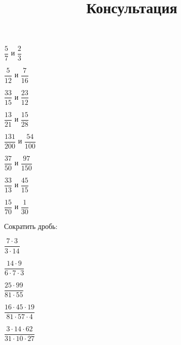 \begin{listofex}
	\begin{enumcols}[itemcolumns=4]
		\item \( \dfrac{5}{7} \) и \( \dfrac{2}{3} \)
		\item \( \dfrac{5}{12} \) и \( \dfrac{7}{16} \)
		\item \( \dfrac{33}{15} \) и \( \dfrac{23}{12} \)
		\item \( \dfrac{13}{21} \) и \( \dfrac{15}{28} \)
		\item \( \dfrac{131}{200} \) и \( \dfrac{54}{100} \)
		\item \( \dfrac{37}{50} \) и \( \dfrac{97}{150} \)
		\item \( \dfrac{33}{13} \) и \( \dfrac{45}{15} \)
		\item \( \dfrac{15}{70} \) и \( \dfrac{1}{30} \)
	\end{enumcols}
	\item Сократить дробь:
	\begin{enumcols}[itemcolumns=5]
		\item \( \dfrac{7\cdot3}{3\cdot14} \)
		\item \( \dfrac{14\cdot9}{6\cdot7\cdot3} \)
		\item \( \dfrac{25\cdot99}{81\cdot55} \)
		\item \( \dfrac{16\cdot45\cdot19}{81\cdot57\cdot4} \)
		\item \( \dfrac{3\cdot14\cdot62}{31\cdot10\cdot27} \)
	\end{enumcols}
\end{listofex}
%
%
\newpage
\title{Консультация}
